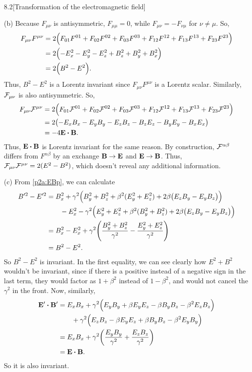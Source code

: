 \documentclass[12pt]{article}
\begin{document}
\begin{problem}{8.2}[Transformation of the electromagnetic field]
\begin{solution}
(b) Because $F_{\mu\nu}$ is antisymmetric, $F_{\mu\mu}=0$, while
$F_{\mu\nu}=-F_{\nu\mu}$ for $\nu\neq\mu$. So,
\begin{align}
    F_{\mu\nu}F^{\mu\nu}
    &=2\qty(F_{01}F^{01}+F_{02}F^{02}+F_{03}F^{03}+F_{12}F^{12}
    +F_{13}F^{13}+F_{23}F^{23})\notag\\
    &=2\qty(-E_x^2-E_y^2-E_z^2+B_z^2+B_y^2+B_x^2)\notag\\
    &=2\qty(B^2-E^2).
\end{align}
Thus, $B^2-E^2$ is a Lorentz invariant since $F_{\mu\nu}F^{\mu\nu}$ is a Lorentz
scalar. Similarly, $\mathcal{F}_{\mu\nu}$ is also antisymmetric. So,
\begin{align}
    F_{\mu\nu}\FF^{\mu\nu}
    &=2\qty(F_{01}\FF^{01}+F_{02}\FF^{02}+F_{03}\FF^{03} +F_{12}\FF^{12}
        +F_{13}\FF^{13}+F_{23}\FF^{23})\notag\\
    &=2\qty(-E_xB_x-E_yB_y-E_zB_z-B_zE_z-B_yE_y-B_xE_x)\notag\\
    &=-4\vb{E}\vdot\vb{B}.
\end{align}
Thus, $\vb{E}\vdot\vb{B}$ is Lorentz invariant for the same reason. By
construction, $\mathcal{F}^{\alpha\beta}$ differs from $F^{\alpha\beta}$ by an exchange
$\vb{B}\to\vb{E}$ and $\vb{E}\to\vb{B}$. Thus,
$\mathcal{F}_{\mu\nu}\mathcal{F}^{\mu\nu}=2(E^2-B^2)$, which doesn't reveal any additional
information.

(c) From \eqref{p2a:EBp}, we can calculate
\begin{align}
    B'^2-E'^2
    &=B_x^2+\gamma^2\qty(B_y^2+B_z^2+\beta^2(E_y^2+E_z^2)+2\beta\qty(E_zB_y-E_yB_z))\notag\\
    &\qquad-E_x^2
    -\gamma^2\qty(E_y^2+E_z^2+\beta^2(B_y^2+B_z^2)+2\beta\qty(E_zB_y-E_yB_z))
    \notag\\
    &=B_x^2-E_x^2+\gamma^2\qty(\frac{B_y^2+B_z^2}{\gamma^2}-\frac{E_y^2+E_z^2}{\gamma^2})\notag\\
    &=B^2-E^2.
\end{align}
So $B^2-E^2$ is invariant. In the first equality, we can see clearly
how $E^2+B^2$ wouldn't be invariant, since if there is a positive
instead of a negative sign in the last term, they would factor as
$1+\beta^2$ instead of $1-\beta^2$, and would not cancel the $\gamma^2$
in the front. Now, similarly,
\begin{align}
    \vb{E}'\vdot\vb{B}' 
    &=E_xB_x+\gamma^2\qty(E_yB_y+\beta E_yE_z-\beta B_yB_z-\beta^2E_zB_z)
    \notag\\
    &\qquad+\gamma^2\qty(E_zB_z-\beta E_yE_z+\beta B_yB_z -\beta^2 E_yB_y)
    \notag\\
    &=E_xB_x+\gamma^2\qty(\frac{E_yB_y}{\gamma^2}+\frac{E_zB_z}{\gamma^2})\notag\\
    &=\vb{E}\vdot\vb{B}.
\end{align}
So it is also invariant.


\end{solution}
\end{problem}
\end{document}
